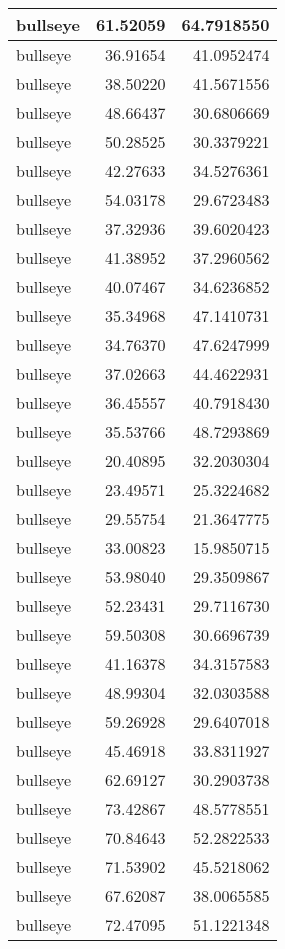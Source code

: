 \documentclass[
]{book}
\theoremstyle{definition}
\theoremstyle{definition}
\theoremstyle{definition}
\theoremstyle{definition}
\theoremstyle{remark}
\begin{document}
\begin{tabular}{l|r|r}
\hline
bullseye & 61.52059 & 64.7918550\\
\hline
bullseye & 36.91654 & 41.0952474\\
\hline
bullseye & 38.50220 & 41.5671556\\
\hline
bullseye & 48.66437 & 30.6806669\\
\hline
bullseye & 50.28525 & 30.3379221\\
\hline
bullseye & 42.27633 & 34.5276361\\
\hline
bullseye & 54.03178 & 29.6723483\\
\hline
bullseye & 37.32936 & 39.6020423\\
\hline
bullseye & 41.38952 & 37.2960562\\
\hline
bullseye & 40.07467 & 34.6236852\\
\hline
bullseye & 35.34968 & 47.1410731\\
\hline
bullseye & 34.76370 & 47.6247999\\
\hline
bullseye & 37.02663 & 44.4622931\\
\hline
bullseye & 36.45557 & 40.7918430\\
\hline
bullseye & 35.53766 & 48.7293869\\
\hline
bullseye & 20.40895 & 32.2030304\\
\hline
bullseye & 23.49571 & 25.3224682\\
\hline
bullseye & 29.55754 & 21.3647775\\
\hline
bullseye & 33.00823 & 15.9850715\\
\hline
bullseye & 53.98040 & 29.3509867\\
\hline
bullseye & 52.23431 & 29.7116730\\
\hline
bullseye & 59.50308 & 30.6696739\\
\hline
bullseye & 41.16378 & 34.3157583\\
\hline
bullseye & 48.99304 & 32.0303588\\
\hline
bullseye & 59.26928 & 29.6407018\\
\hline
bullseye & 45.46918 & 33.8311927\\
\hline
bullseye & 62.69127 & 30.2903738\\
\hline
bullseye & 73.42867 & 48.5778551\\
\hline
bullseye & 70.84643 & 52.2822533\\
\hline
bullseye & 71.53902 & 45.5218062\\
\hline
bullseye & 67.62087 & 38.0065585\\
\hline
bullseye & 72.47095 & 51.1221348\\

\end{tabular}
\end{document}
